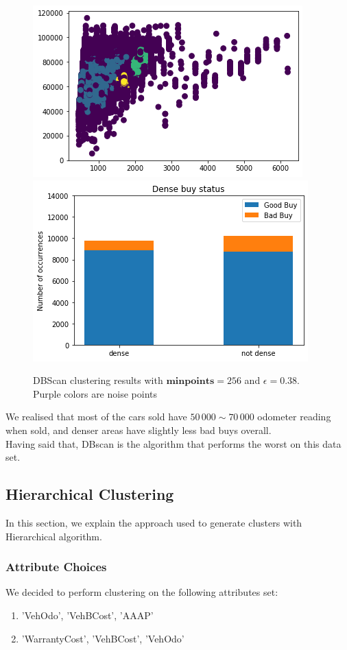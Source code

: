 \documentclass{article}
\begin{document}
\begin{figure}[H]
\centering
\includegraphics[width=.49\textwidth]{cazzo}\hfill
\includegraphics[width=.49\textwidth]{bigboi}\hfill
\caption{DBScan clustering results with $\mathbf{minpoints} = 256$ and $\epsilon = 0.38$. Purple colors are noise points}
\label{fig:dbscan}
\end{figure}

We realised that most of the cars sold have $50\,000 \sim 70\,000$ odometer reading when sold, and denser areas have slightly less bad buys overall. \\
Having said that, DBscan is the algorithm that performs the worst on this data set.

\subsection{Hierarchical Clustering}
In this section, we explain the approach used to generate clusters with Hierarchical algorithm.
\subsubsection{Attribute Choices}
We decided to perform clustering on the following attributes set:
\begin{enumerate}
    \item 'VehOdo', 'VehBCost', 'AAAP'
    \item 'WarrantyCost', 'VehBCost', 'VehOdo'
\end{enumerate}
\end{document}
